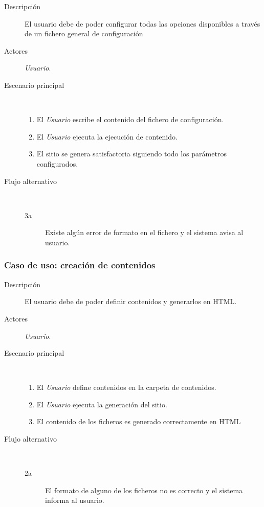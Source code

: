 \begin{description}
    \item[Descripción] El usuario debe de poder configurar todas las opciones disponibles
        a través de un fichero general de configuración
    \item[Actores] \textit{Usuario}.
    \item[Escenario principal] $\quad$
        \begin{enumerate}
            \item El \textit{Usuario} escribe el contenido del fichero de configuración.
            \item El \textit{Usuario} ejecuta la ejecución de contenido.
            \item El sitio se genera satisfactoria siguiendo todo los parámetros configurados.
        \end{enumerate}
    \item[Flujo alternativo] $\quad$
        \begin{description}
            \item[3a] Existe algún error de formato en el fichero y el sistema avisa al usuario.
        \end{description}
\end{description}

\subsubsection{Caso de uso: creación de contenidos}

\begin{description}
    \item[Descripción] El usuario debe de poder definir contenidos y generarlos en HTML.
    \item[Actores] \textit{Usuario}.
    \item[Escenario principal] $\quad$
        \begin{enumerate}
            \item El \textit{Usuario} define contenidos en la carpeta de contenidos.
            \item El \textit{Usuario} ejecuta la generación del sitio.
            \item El contenido de los ficheros es generado correctamente en HTML
        \end{enumerate}
    \item[Flujo alternativo] $\quad$
        \begin{description}
            \item[2a] El formato de alguno de los ficheros no es correcto y el sistema informa al usuario.
        \end{description}
\end{description}

